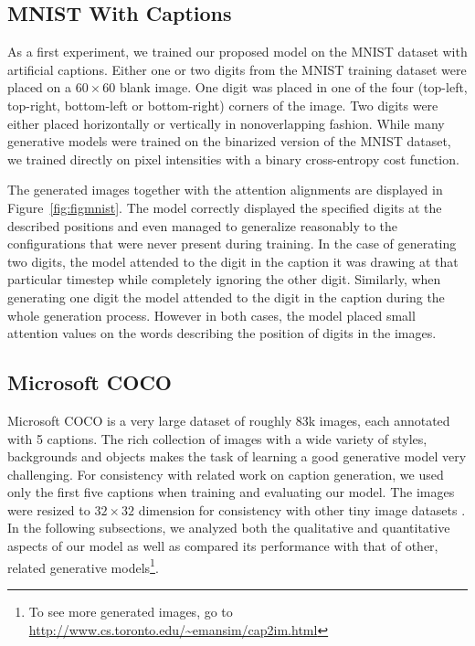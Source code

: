 \documentclass{article} %
\begin{document}
\subsection{MNIST With Captions}
As a first experiment, we trained our proposed model on the MNIST dataset with artificial captions. Either one or two digits from the MNIST training dataset were placed on a $60 \times 60$ blank image. One digit was placed in one of the four (top-left, top-right, bottom-left or bottom-right) corners of the image. Two digits were either placed horizontally or vertically in nonoverlapping fashion. 
While many generative models were trained on the binarized version of the MNIST dataset, we trained directly on pixel intensities with a binary cross-entropy cost function.

The generated images together with the attention alignments are displayed in Figure~\ref{fig:figmnist}. The model correctly displayed the specified digits at the described positions and even managed to generalize reasonably to the configurations that were never present during training. 
In the case of generating two digits, the model attended to the digit in the caption it was drawing at that particular timestep while completely ignoring the other digit. 
Similarly, when generating one digit the model attended to the digit in the caption during the whole generation process. However in both cases, the model placed small attention values on the words describing the position of digits in the images.

\subsection{Microsoft COCO}

Microsoft COCO \citep{mscoco} is a very large dataset of roughly 83k images, each annotated with 5 captions. The rich collection of images with a wide variety of styles, backgrounds and objects makes the task of learning a good generative model 
very challenging. For consistency with related work on caption generation, we used only the first five captions when training and evaluating our model. 
The images were resized to $32 \times 32$ dimension for consistency with other tiny image datasets \citep{krizhevsky_cifar}. In the following subsections, we analyzed both the qualitative and quantitative aspects of our model as well as compared its performance with that of other, related generative models\footnote{To see more generated images, go to \url{http://www.cs.toronto.edu/~emansim/cap2im.html}}.
\end{document}
